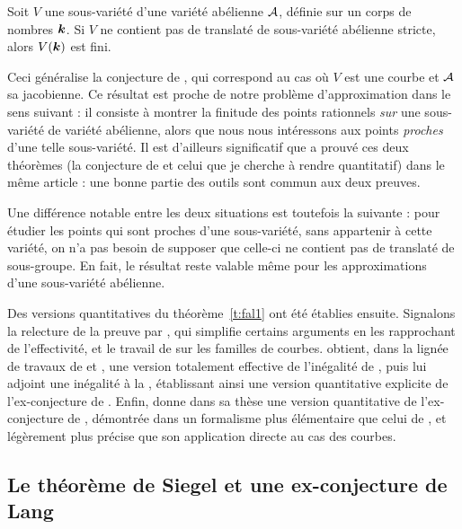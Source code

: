 \begin{thm} \label{t:fal1}
  Soit $V$ une sous-variété d'une variété abélienne $\mathcal A$, définie sur un
  corps de nombres ${\boldsymbol k}$. Si $V$ ne contient pas de translaté de sous-variété
  abélienne stricte, alors $V({\boldsymbol k})$ est fini.
\end{thm}

Ceci généralise la conjecture de , qui correspond au cas où $V$
est une courbe et $\mathcal A$ sa jacobienne. Ce résultat est proche de notre problème
d'approximation dans le sens suivant : il consiste à montrer la finitude des
points rationnels \emph{sur} une sous-variété de variété abélienne, alors que
nous nous intéressons aux points \emph{proches} d'une telle sous-variété. Il
est d'ailleurs significatif que  a prouvé ces deux théorèmes (la
conjecture de  et celui que je cherche à rendre quantitatif)
dans le même article : une bonne partie des outils sont commun aux deux
preuves.

Une différence notable entre les deux situations est toutefois la suivante :
pour étudier les points qui sont proches d'une sous-variété, sans appartenir
à cette variété, on n'a pas besoin de supposer que celle-ci ne contient pas de
translaté de sous-groupe. En fait, le résultat reste valable même pour les
approximations d'une sous-variété abélienne.

Des versions quantitatives du théorème~\ref{t:fal1} ont été établies ensuite.
Signalons la relecture de la preuve par , qui simplifie certains
arguments en les rapprochant de l'effectivité, et le travail de 
sur les familles de courbes.  obtient, dans la lignée de travaux de
 et , une version totalement effective de
l'inégalité de  \cite{remivds}, puis lui adjoint une inégalité à la
, établissant ainsi une version quantitative \cite{remdcl}
explicite de l'ex-conjecture de . Enfin, 
\cite[chapitre~3]{farhith} donne dans sa thèse une version quantitative de
l'ex-conjecture de , démontrée dans un formalisme plus élémentaire
que celui de , et légèrement plus précise que son application
directe au cas des courbes.

\subsection{Le théorème de Siegel et une ex-conjecture de Lang}
\label{s:siegel}

